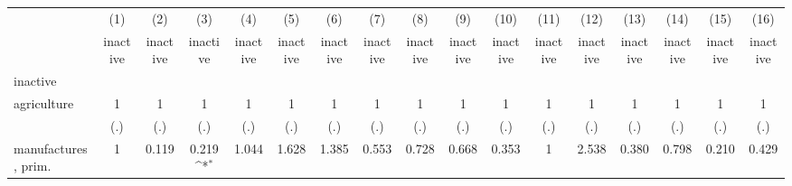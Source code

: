 {
\def\sym#1{\ifmmode^{#1}\else\(^{#1}\)\fi}
\begin{tabular}{l*{16}{c}}
\hline\hline
                    &\multicolumn{1}{c}{(1)}&\multicolumn{1}{c}{(2)}&\multicolumn{1}{c}{(3)}&\multicolumn{1}{c}{(4)}&\multicolumn{1}{c}{(5)}&\multicolumn{1}{c}{(6)}&\multicolumn{1}{c}{(7)}&\multicolumn{1}{c}{(8)}&\multicolumn{1}{c}{(9)}&\multicolumn{1}{c}{(10)}&\multicolumn{1}{c}{(11)}&\multicolumn{1}{c}{(12)}&\multicolumn{1}{c}{(13)}&\multicolumn{1}{c}{(14)}&\multicolumn{1}{c}{(15)}&\multicolumn{1}{c}{(16)}\\
                    &\multicolumn{1}{c}{inactive}&\multicolumn{1}{c}{inactive}&\multicolumn{1}{c}{inactive}&\multicolumn{1}{c}{inactive}&\multicolumn{1}{c}{inactive}&\multicolumn{1}{c}{inactive}&\multicolumn{1}{c}{inactive}&\multicolumn{1}{c}{inactive}&\multicolumn{1}{c}{inactive}&\multicolumn{1}{c}{inactive}&\multicolumn{1}{c}{inactive}&\multicolumn{1}{c}{inactive}&\multicolumn{1}{c}{inactive}&\multicolumn{1}{c}{inactive}&\multicolumn{1}{c}{inactive}&\multicolumn{1}{c}{inactive}\\
\hline
inactive            &                     &                     &                     &                     &                     &                     &                     &                     &                     &                     &                     &                     &                     &                     &                     &                     \\
agriculture         &           1         &           1         &           1         &           1         &           1         &           1         &           1         &           1         &           1         &           1         &           1         &           1         &           1         &           1         &           1         &           1         \\
                    &         (.)         &         (.)         &         (.)         &         (.)         &         (.)         &         (.)         &         (.)         &         (.)         &         (.)         &         (.)         &         (.)         &         (.)         &         (.)         &         (.)         &         (.)         &         (.)         \\
[1em]
manufactures, prim. &           1         &       0.119         &       0.219\sym{*}  &       1.044         &       1.628         &       1.385         &       0.553         &       0.728         &       0.668         &       0.353         &           1         &       2.538         &       0.380         &       0.798         &       0.210         &       0.429         \\

\end{tabular}}
